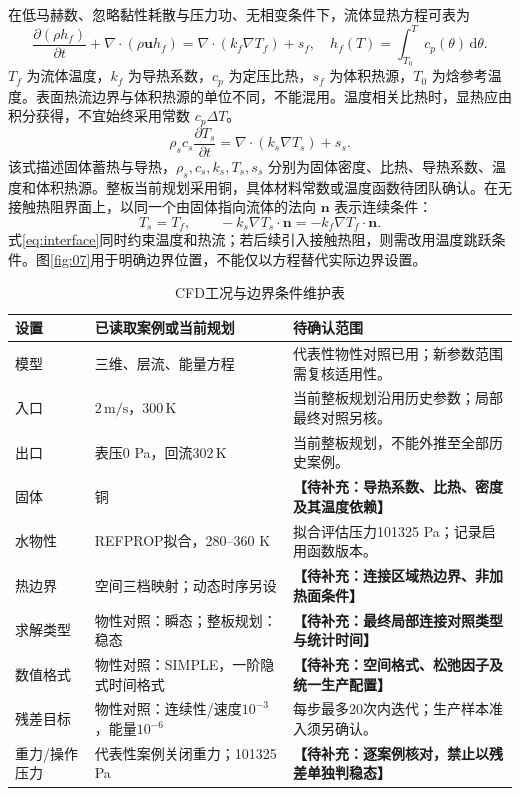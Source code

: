 \documentclass[stage2,UTF8,fontset=fandol]{ydzjreport}
\DeclareRobustCommand{\TBD}[1]{{\color{ydzjgrey}\textbf{【待补充：#1】}}}
\begin{document}
在低马赫数、忽略黏性耗散与压力功、无相变条件下，流体显热方程可表为
\begin{equation}
\frac{\partial(\rho h_f)}{\partial t}+\nabla\cdot(\rho\bm u h_f)
=\nabla\cdot(k_f\nabla T_f)+s_f,
\quad h_f(T)=\int_{T_0}^{T}c_p(\theta)\,\mathrm d\theta.\label{eq:fluidenergy}
\end{equation}
$T_f$ 为流体温度，$k_f$ 为导热系数，$c_p$ 为定压比热，$s_f$ 为体积热源，$T_0$ 为焓参考温度。表面热流边界与体积热源的单位不同，不能混用。温度相关比热时，显热应由积分获得，不宜始终采用常数 $c_p\Delta T$。
\begin{equation}
\rho_s c_s\frac{\partial T_s}{\partial t}=\nabla\cdot(k_s\nabla T_s)+s_s.\label{eq:solidenergy}
\end{equation}
该式描述固体蓄热与导热，$\rho_s,c_s,k_s,T_s,s_s$ 分别为固体密度、比热、导热系数、温度和体积热源。整板当前规划采用铜，具体材料常数或温度函数待团队确认。在无接触热阻界面上，以同一个由固体指向流体的法向 $\bm n$ 表示连续条件：
\begin{equation}
T_s=T_f,\qquad -k_s\nabla T_s\cdot\bm n=-k_f\nabla T_f\cdot\bm n.\label{eq:interface}
\end{equation}
式\eqref{eq:interface}同时约束温度和热流；若后续引入接触热阻，则需改用温度跳跃条件。图\ref{fig:07}用于明确边界位置，不能仅以方程替代实际边界设置。
\begin{table}[htbp]
\centering\small
\caption{CFD工况与边界条件维护表}\label{tab:03}
\begin{tabularx}{\linewidth}{lYY}
\toprule
{} 设置 & 已读取案例或当前规划 & 待确认范围 \\
\midrule
模型 & 三维、层流、能量方程 & 代表性物性对照已用；新参数范围需复核适用性。 \\
入口 & $2\,\mathrm{m/s}$，$300\,\mathrm K$ & 当前整板规划沿用历史参数；局部最终对照另核。 \\
出口 & 表压0 Pa，回流$302\,\mathrm K$ & 当前整板规划，不能外推至全部历史案例。 \\
固体 & 铜 & \TBD{导热系数、比热、密度及其温度依赖} \\
水物性 & REFPROP拟合，280--360 K & 拟合评估压力101325 Pa；记录启用函数版本。 \\
热边界 & 空间三档映射；动态时序另设 & \TBD{连接区域热边界、非加热面条件} \\
求解类型 & 物性对照：瞬态；整板规划：稳态 & \TBD{最终局部连接对照类型与统计时间} \\
数值格式 & 物性对照：SIMPLE，一阶隐式时间格式 & \TBD{空间格式、松弛因子及统一生产配置} \\
残差目标 & 物性对照：连续性/速度$10^{-3}$，能量$10^{-6}$ & 每步最多20次内迭代；生产样本准入须另确认。 \\
重力/操作压力 & 代表性案例关闭重力；101325 Pa & \TBD{逐案例核对，禁止以残差单独判稳态} \\
\bottomrule
\end{tabularx}
\end{table}
\end{document}
